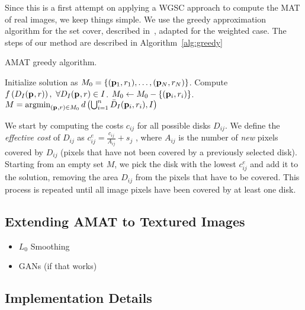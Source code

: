 \documentclass[10pt,twocolumn,letterpaper]{article}
\begin{document}
Since this is a first attempt on applying a WGSC approach to compute the MAT of real images, we keep things simple.
We use the greedy approximation algorithm for the set cover, described in~\cite{vazirani2013approximation},
adapted for the weighted case.
The steps of our method are described in Algorithm~\ref{alg:greedy}
\begin{algorithm}
\caption{AMAT greedy algorithm.}
\label{alg:greedy}
	\begin{algorithmic}[1]
		 
		\State Initialize solution as $M_0 = \{(\mathbf{p}_{1},r_1),\ldots,(\mathbf{p}_{N},r_N)\}$.
		\State Compute $f\left( D_I(\mathbf{p}_{},r) \right),\  \forall D_I(\mathbf{p}_{},r) \in I$.
		  
				$M_0 \gets M_0-\{(\mathbf{p}_{i},r_i)\}$.
			\EndIf
		\EndFor
		\State $M = \operatorname*{argmin}_{(\mathbf{p}_{},r)\in M_0}{d\left( \bigcup_{i=1}^n \bar D_I(\mathbf{p}_{i},r_i), I \right)}$ 
		\EndProcedure
	\end{algorithmic}
\end{algorithm}
We start by computing the costs $c_{ij}$ for all possible disks $D_{ij}$.
We define the \emph{effective cost} of $D_{ij}$ as $c_{ij}^e = \frac{c_{ij}}{A_{ij}} + s_j$ , where $A_{ij}$ is the number
of \emph{new} pixels covered by $D_{ij}$ (pixels that have not been covered by a previously selected disk).
Starting from an empty set $M$, we pick the disk with the lowest $c_{ij}^e$ and add it to the solution, 
removing the area $D_{ij}$ from the pixels that have to be covered.
This process is repeated until all image pixels have been covered by at least one disk.

 
\subsection{Extending AMAT to Textured Images}\label{sec:texture}
\begin{itemize}
\item $L_0$ Smoothing
\item GANs (if that works)
\end{itemize}

\subsection{Implementation Details}\label{sec:implementation}
\end{document}
